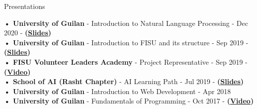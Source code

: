 \documentclass{resume} %
\begin{document}
\begin{rSection}{Presentations}

\textbf{• University of Guilan} - Introduction to Natural Language Processing - Dec 2020 -  \textbf{(\underline{\href{https://github.com/Ledengary/NLP-presentation}{Slides}})} \\
\textbf{• University of Guilan} - Introduction to FISU and its structure - Sep 2019 -  \textbf{(\underline{\href{https://www.dropbox.com/s/z6gecn4uf79xkv1/FISUstructure.pptx?dl=0}{Slides}})} \\
\textbf{• FISU Volunteer Leaders Academy} - Project Representative - Sep 2019 - \textbf{(\underline{\href{https://www.dropbox.com/s/coz500uofiyhz8y/IMG_4156.MOV?dl=0}{Video}})} \\
\textbf{• School of AI (Rasht Chapter)} - AI Learning Path - Jul 2019 - \textbf{(\underline{\href{https://github.com/rasht-school-of-ai/Meetup-Materials/blob/master/Fourth\%20Meetup/Learning\%20Path.pdf}{Slides}})} \\
\textbf{• University of Guilan} - Introduction to Web Development - Apr 2018 \\
\textbf{• University of Guilan} - Fundamentals of Programming - Oct 2017 - \textbf{(\underline{\href{https://www.dropbox.com/s/4x48a2lrgyj50d3/IMG_4229.mp4?dl=0}{Video}})}



\end{rSection}
\end{document}
